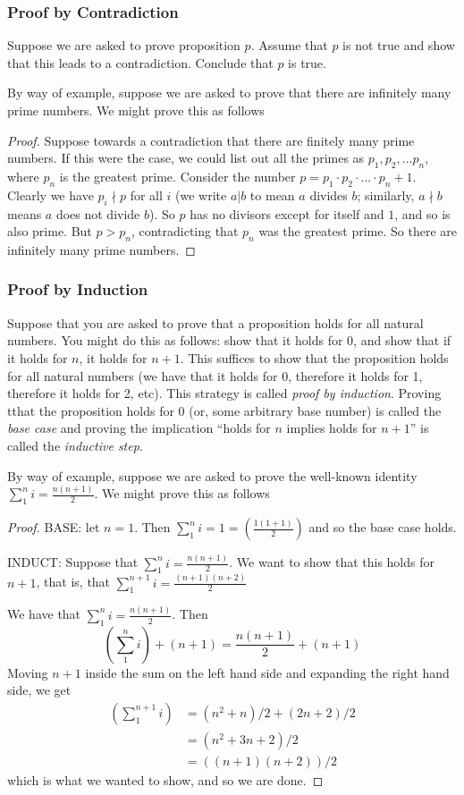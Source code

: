 \documentclass[12pt]{article}
\begin{document}
\subsubsection*{Proof by Contradiction} Suppose we are asked to prove proposition $p$. Assume that $p$ is not true and show that this leads to a contradiction. Conclude that $p$ is true. 

By way of example, suppose we are asked to prove that there are infinitely many prime numbers. We might prove this as follows

\begin{proof}
Suppose towards a contradiction that there are finitely many prime numbers. If this were the case, we could list out all the primes as $p_1,p_2,...p_n$, where $p_n$ is the greatest prime. Consider the number $p = p_1 \cdot p_2 \cdot ... \cdot p_n + 1$. Clearly we have $p_i \nmid p$ for all $i$ (we write $a | b$ to mean $a$ divides $b$; similarly, $a \nmid b$ means $a$ does not divide $b$). So $p$ has no divisors except for itself and $1$, and so is also prime. But $p > p_n$, contradicting that $p_n$ was the greatest prime. So there are infinitely many prime numbers. 
\end{proof}

\subsubsection*{Proof by Induction} Suppose that you are asked to prove that a proposition holds for all natural numbers. You might do this as follows: show that it holds for 0, and show that if it holds for $n$, it holds for $n + 1$. This suffices to show that the proposition holds for all natural numbers (we have that it holds for 0, therefore it holds for 1, therefore it holds for 2, etc). This strategy is called \emph{proof by induction}. Proving tthat the proposition holds for 0 (or, some arbitrary base number) is called the \emph{base case} and proving the implication ``holds for $n$ implies holds for $n + 1$'' is called the \emph{inductive step}. 

By way of example, suppose we are asked to prove the well-known identity $\sum_1^ni = \frac{n(n+1)}{2}$. We might prove this as follows

\begin{proof}
BASE: let $n = 1$. Then $\sum_1^ni = 1 = (\frac{1(1+1)}{2})$ and so the base case holds. 

INDUCT: Suppose that $\sum_1^ni = \frac{n(n+1)}{2}$. We want to show that this holds for $n + 1$, that is, that $\sum_1^{n + 1}i = \frac{(n + 1)(n+2)}{2}$

We have that $\sum_1^ni = \frac{n(n+1)}{2}$. Then 
\[
  (\sum_1^ni) + (n + 1)= \frac{n(n+1)}{2} + (n + 1)
\]
Moving $n + 1$ inside the sum on the left hand side and expanding the right hand side, we get
\begin{align*}
(\sum_1^{n + 1}i) &= (n^2 + n)/2 + (2n + 2)/2 \\
&= (n^2 + 3n + 2)/2 \\
&= ((n+1)(n+2))/2
\end{align*}
which is what we wanted to show, and so we are done. 
\end{proof}
\end{document}
